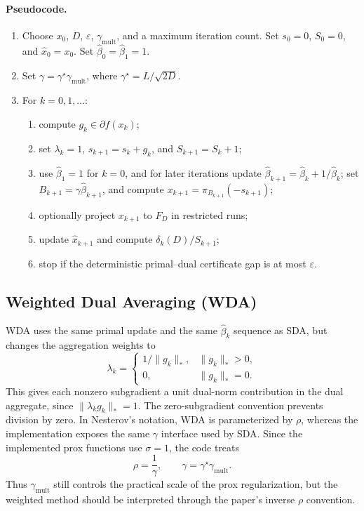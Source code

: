 \documentclass[11pt]{article}
\begin{document}
\paragraph{Pseudocode.}
\begin{enumerate}
    \item Choose \(x_0\), \(D\), \(\varepsilon\), \(\gamma_{\mathrm{mult}}\),
    and a maximum iteration count.  Set \(s_0=0\), \(S_0=0\), and
    \(\hat x_0=x_0\).  Set \(\hat\beta_0=\hat\beta_1=1\).
    \item Set \(\gamma=\gamma^\star\gamma_{\mathrm{mult}}\), where
    \(\gamma^\star=L/\sqrt{2D}\).
    \item For \(k=0,1,\ldots\):
    \begin{enumerate}
        \item compute \(g_k\in\partial f(x_k)\);
        \item set \(\lambda_k=1\), \(s_{k+1}=s_k+g_k\), and
        \(S_{k+1}=S_k+1\);
        \item use \(\hat\beta_1=1\) for \(k=0\), and for later iterations
        update \(\hat\beta_{k+1}=\hat\beta_k+1/\hat\beta_k\); set
        \(B_{k+1}=\gamma\hat\beta_{k+1}\), and compute
        \(x_{k+1}=\pi_{B_{k+1}}(-s_{k+1})\);
        \item optionally project \(x_{k+1}\) to \(F_D\) in restricted runs;
        \item update \(\hat x_{k+1}\) and compute
        \(\delta_k(D)/S_{k+1}\);
        \item stop if the deterministic primal--dual certificate gap is at
        most \(\varepsilon\).
    \end{enumerate}
\end{enumerate}

\subsection{Weighted Dual Averaging (WDA)}

WDA uses the same primal update and the same \(\hat\beta_k\) sequence as SDA,
but changes the aggregation weights to
\[
    \lambda_k=
    \begin{cases}
        1/\|g_k\|_*, & \|g_k\|_*>0,\\
        0, & \|g_k\|_*=0.
    \end{cases}
\]
This gives each nonzero subgradient a unit dual-norm contribution in the dual
aggregate, since \(\|\lambda_k g_k\|_*=1\).  The zero-subgradient convention
prevents division by zero.
In Nesterov's notation, WDA is parameterized by \(\rho\), whereas the
implementation exposes the same \(\gamma\) interface used by SDA.  Since
the implemented prox functions use \(\sigma=1\), the code treats
\[
    \rho=\frac{1}{\gamma},
    \qquad
    \gamma=\gamma^\star\gamma_{\mathrm{mult}}.
\]
Thus \(\gamma_{\mathrm{mult}}\) still controls the practical scale of the
prox regularization, but the weighted method should be interpreted through the
paper's inverse \(\rho\) convention.
\end{document}
